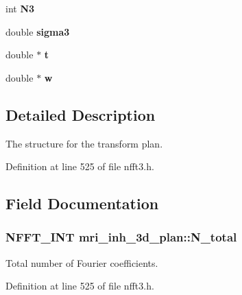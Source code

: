 \begin{DoxyCompactItemize}
\item 
\hypertarget{structmri__inh__3d__plan_af12a214bc2e75f1188cd7ff1bb99f0ff}{int {\bfseries N3}}\label{structmri__inh__3d__plan_af12a214bc2e75f1188cd7ff1bb99f0ff}

\item 
\hypertarget{structmri__inh__3d__plan_a88b160a5bf9943ebffc65365f2b7663f}{double {\bfseries sigma3}}\label{structmri__inh__3d__plan_a88b160a5bf9943ebffc65365f2b7663f}

\item 
\hypertarget{structmri__inh__3d__plan_ae7fe0fd3fb4509abc5a7a7c07df63a1b}{double $\ast$ {\bfseries t}}\label{structmri__inh__3d__plan_ae7fe0fd3fb4509abc5a7a7c07df63a1b}

\item 
\hypertarget{structmri__inh__3d__plan_aaf6f68ab1fa5e3b852487bf12dc483ff}{double $\ast$ {\bfseries w}}\label{structmri__inh__3d__plan_aaf6f68ab1fa5e3b852487bf12dc483ff}

\end{DoxyCompactItemize}


\subsection{Detailed Description}
The structure for the transform plan. 

Definition at line 525 of file nfft3.\-h.



\subsection{Field Documentation}
\hypertarget{structmri__inh__3d__plan_abe6874af3f51df4ea117d9c92cf925a1}{
\subsubsection[{N\-\_\-total}]{\setlength{\rightskip}{0pt plus 5cm}N\-F\-F\-T\-\_\-\-I\-N\-T mri\-\_\-inh\-\_\-3d\-\_\-plan\-::\-N\-\_\-total}}\label{structmri__inh__3d__plan_abe6874af3f51df4ea117d9c92cf925a1}


Total number of Fourier coefficients. 



Definition at line 525 of file nfft3.\-h.




